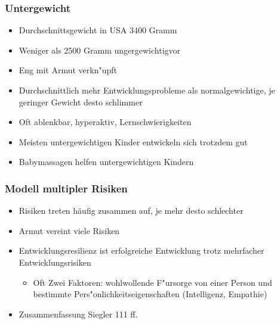 \subsubsection{Untergewicht}
\begin{itemize}
	\item
		Durchschnittsgewicht in USA 3400 Gramm
	\item
		Weniger als 2500 Gramm ungergewichtigvor
	\item
		Eng mit Armut verkn"upft
	\item
		Durchschnittlich mehr Entwicklungsprobleme als normalgewichtige, je geringer Gewicht desto schlimmer
	\item
		Oft ablenkbar, hyperaktiv, Lernschwierigkeiten
	\item
		Meisten untergewichtigen Kinder entwickeln sich trotzdem gut
	\item
		Babymassagen helfen untergewichtigen Kindern
\end{itemize}


\subsubsection{Modell multipler Risiken}
\begin{itemize}
	\item
		Risiken treten häufig zusammen auf, je mehr desto schlechter
	\item
		Armut vereint viele Risiken
	\item
		Entwicklungsresilienz ist erfolgreiche Entwicklung trotz mehrfacher Entwicklungsrisiken
		\begin{itemize}
			\item
				Oft Zwei Faktoren: wohlwollende F"ursorge von einer Person und bestimmte Pers"onlichkeitseigenschaften (Intelligenz, Empathie)
		\end{itemize}

	\item
		Zusammenfassung Siegler 111 ff.
\end{itemize}

